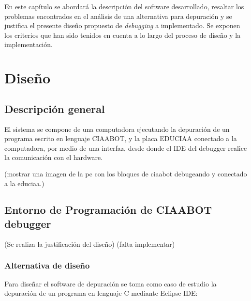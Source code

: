 En este capítulo se abordará la descripción del software desarrollado, resaltar los problemas encontrados en el análisis de una alternativa para depuración y se justifica el presente diseño propuesto de \emph{debugging} a implementado. Se exponen los criterios que han sido tenidos en cuenta a lo largo del proceso de diseño y la implementación.


\section{Diseño}
\label{sec:Diseño}

\subsection{Descripción general}
\label{subsec:Descripción general}

El sistema se compone de una computadora ejecutando la depuración de un programa escrito en lenguaje CIAABOT, y la placa EDUCIAA conectado a la computadora, por medio de una interfaz, desde donde el IDE del debugger realice la comunicación con el hardware.

(mostrar una imagen de la pc con los bloques de ciaabot debugeando y conectado a la educiaa.)

\subsection{Entorno de Programación de CIAABOT debugger}
\label{subsec:Entorno de Programación}

(Se realiza la justificación del diseño) (falta implementar)


\subsubsection{Alternativa de diseño}
\label{subsubsec:Alternativas de diseño para CIAABOT debugger}

Para diseñar el software de depuración se toma como caso de estudio la depuración de un programa en lenguaje C mediante Eclipse IDE:

